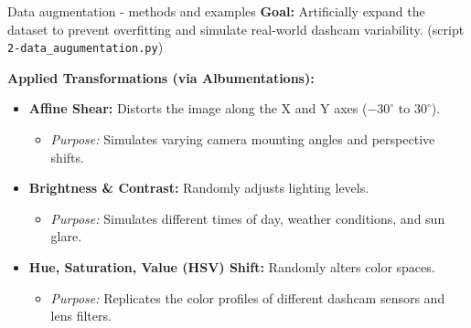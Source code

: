 \documentclass{beamer}
\begin{document}
\begin{frame}{Data augmentation - methods and examples}
    \textbf{Goal:} Artificially expand the dataset to prevent overfitting and simulate real-world dashcam variability. (script \texttt{2-data\_augumentation.py})
    
    \vspace{0.3cm}
    \textbf{Applied Transformations (via Albumentations):}
    \begin{itemize}
        \item \textbf{Affine Shear:} Distorts the image along the X and Y axes ($-30^\circ$ to $30^\circ$).
        \begin{itemize}
            \item \textit{Purpose:} Simulates varying camera mounting angles and perspective shifts.
        \end{itemize}
        \item \textbf{Brightness \& Contrast:} Randomly adjusts lighting levels.
        \begin{itemize}
            \item \textit{Purpose:} Simulates different times of day, weather conditions, and sun glare.
        \end{itemize}
        \item \textbf{Hue, Saturation, Value (HSV) Shift:} Randomly alters color spaces.
        \begin{itemize}
            \item \textit{Purpose:} Replicates the color profiles of different dashcam sensors and lens filters.
        \end{itemize}
    \end{itemize}
\end{frame}
\end{document}
